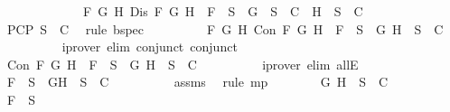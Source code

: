 \begin{isabellebody}
\ \ \ \ \ \ \ \ \ \ \ \ {\isasymand}\ {\isacharparenleft}{\isasymforall}F\ G\ H{\isachardot}\ Dis\ F\ G\ H\ {\isasymlongrightarrow}\ F\ {\isasymin}\ S{\isacharprime}\ {\isasymlongrightarrow}\ {\isacharbraceleft}G{\isacharbraceright}\ {\isasymunion}\ S{\isacharprime}\ {\isasymin}\ C\ {\isasymor}\ {\isacharbraceleft}H{\isacharbraceright}\ {\isasymunion}\ S{\isacharprime}\ {\isasymin}\ C{\isacharparenright}{\isachardoublequoteclose}\isanewline
\ \ \ \ \ \ \ \ \isamarkupfalse%
\ PCP\ {\isacartoucheopen}S{\isacharprime}\ {\isasymin}\ C{\isacartoucheclose}\ \isamarkupfalse%
\ {\isacharparenleft}rule\ bspec{\isacharparenright}\isanewline
\ \ \ \ \ \ \isamarkupfalse%
\ \isamarkupfalse%
\ {\isachardoublequoteopen}{\isasymforall}F\ G\ H{\isachardot}\ Con\ F\ G\ H\ {\isasymlongrightarrow}\ F\ {\isasymin}\ S{\isacharprime}\ {\isasymlongrightarrow}\ {\isacharbraceleft}G{\isacharcomma}\ H{\isacharbraceright}\ {\isasymunion}\ S{\isacharprime}\ {\isasymin}\ C{\isachardoublequoteclose}\isanewline
\ \ \ \ \ \ \ \ \isamarkupfalse%
\ {\isacharparenleft}iprover\ elim{\isacharcolon}\ conjunct{}\ conjunct{}{\isacharparenright}\isanewline
\ \ \ \ \ \ \isamarkupfalse%
\ \isamarkupfalse%
\ {\isachardoublequoteopen}Con\ F\ G\ H\ {\isasymlongrightarrow}\ F\ {\isasymin}\ S{\isacharprime}\ {\isasymlongrightarrow}\ {\isacharbraceleft}G{\isacharcomma}\ H{\isacharbraceright}\ {\isasymunion}\ S{\isacharprime}\ {\isasymin}\ C{\isachardoublequoteclose}\isanewline
\ \ \ \ \ \ \ \ \isamarkupfalse%
\ {\isacharparenleft}iprover\ elim{\isacharcolon}\ allE{\isacharparenright}\isanewline
\ \ \ \ \ \ \isamarkupfalse%
\ \isamarkupfalse%
\ {\isachardoublequoteopen}F\ {\isasymin}\ S{\isacharprime}\ {\isasymlongrightarrow}\ {\isacharbraceleft}G{\isacharcomma}H{\isacharbraceright}\ {\isasymunion}\ S{\isacharprime}\ {\isasymin}\ C{\isachardoublequoteclose}\isanewline
\ \ \ \ \ \ \ \ \isamarkupfalse%
\ assms{\isacharparenleft}{}{\isacharparenright}\ \isamarkupfalse%
\ {\isacharparenleft}rule\ mp{\isacharparenright}\isanewline
\ \ \ \ \ \ \isamarkupfalse%
\ {\isachardoublequoteopen}{\isacharbraceleft}G{\isacharcomma}\ H{\isacharbraceright}\ {\isasymunion}\ S{\isacharprime}\ {\isasymin}\ C{\isachardoublequoteclose}\isanewline
\ \ \ \ \ \ \ \ \isamarkupfalse%
\ {\isacartoucheopen}F\ {\isasymin}\ S{\isacharprime}{\isacartoucheclose}\ \isamarkupfalse%

\end{isabellebody}
